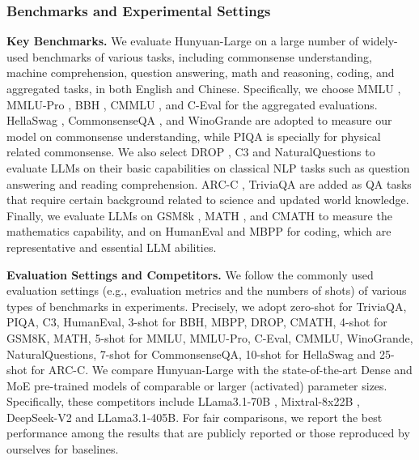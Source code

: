 \documentclass{article}
\begin{document}
\subsubsection{Benchmarks and Experimental Settings}

\textbf{Key Benchmarks.}
We evaluate Hunyuan-Large on a large number of widely-used benchmarks of various tasks, including commonsense understanding, machine comprehension, question answering, math and reasoning, coding, and aggregated tasks, in both English and Chinese.
Specifically, we choose MMLU \citep{hendrycks2021measuring}, MMLU-Pro \citep{wang2024mmlu-pro}, BBH \citep{suzgun2022challenging}, CMMLU \citep{li2023cmmlu}, and C-Eval \citep{huang2024ceval} for the aggregated evaluations.
HellaSwag \citep{zellers2019hellaswag}, CommonsenseQA \citep{talmor2019commonsenseqa}, and WinoGrande \citep{sakaguchi2021winogrande} are adopted to measure our model on commonsense understanding, while PIQA \citep{bisk2020piqa} is specially for physical related commonsense.
We also select DROP \citep{dua2019drop}, C3 \citep{sun2020investigating} and NaturalQuestions\citep{kwiatkowski2019natural} to evaluate LLMs on their basic capabilities on classical NLP tasks such as question answering and reading comprehension. 
ARC-C \citep{clark2018think}, TriviaQA \citep{joshi2017triviaqa} are added as QA tasks that require certain background related to science and updated world knowledge.
Finally, we evaluate LLMs on GSM8k \citep{cobbe2021training}, MATH \cite{hendrycks2021measuring}, and CMATH \citep{wei2023cmath} to measure the mathematics capability, and on HumanEval \citep{chen2021evaluating} and MBPP \citep{austin2021program} for coding, which are representative and essential LLM abilities.

\textbf{Evaluation Settings and Competitors.}
We follow the commonly used evaluation settings (e.g., evaluation metrics and the numbers of shots) of various types of benchmarks in experiments. Precisely, we adopt zero-shot for TriviaQA, PIQA, C3, HumanEval, 3-shot for BBH, MBPP, DROP, CMATH, 4-shot for GSM8K, MATH, 5-shot for MMLU, MMLU-Pro, C-Eval, CMMLU, WinoGrande, NaturalQuestions, 7-shot for CommonsenseQA, 10-shot for HellaSwag and 25-shot for ARC-C.
We compare Hunyuan-Large with the state-of-the-art Dense and MoE pre-trained models of comparable or larger (activated) parameter sizes. Specifically, these competitors include LLama3.1-70B \citep{dubey2024llama}, Mixtral-8x22B \citep{mistral2024mixtral8x22}, DeepSeek-V2 \citep{deepseek2024v2} and LLama3.1-405B. 
For fair comparisons, we report the best performance among the results that are publicly reported or those reproduced by ourselves for baselines.
\end{document}
